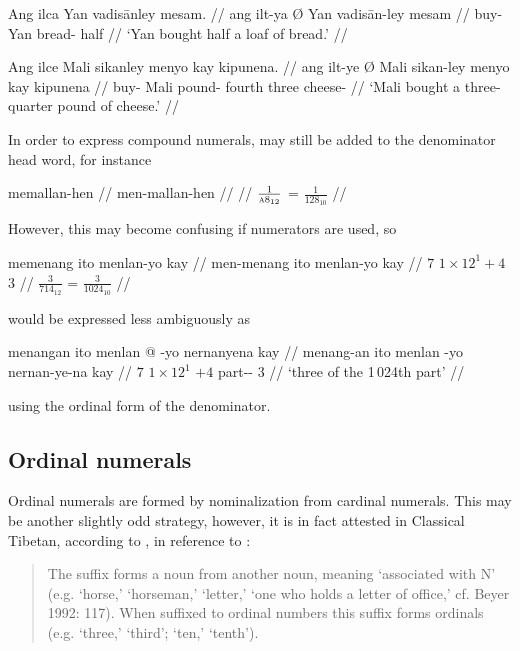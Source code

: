 \pex\label{ex:simplefrac}
\a\begingl
	\gla Ang ilca {} Yan vadisānley mesam. //
	\glb ang ilt-ya Ø Yan vadisān-ley mesam //
	\glc \AgtT{} buy-\TsgM{} \Top{} Yan bread-\PargI{} half //
	\glft `Yan bought half a loaf of bread.' //
\endgl

\a\begingl
	\gla Ang ilce {} Mali sikanley menyo kay kipunena. //
	\glb ang ilt-ye Ø Mali sikan-ley menyo kay kipunena //
	\glc \AgtT{} buy-\TsgM{} \Top{} Mali pound-\PargI{} fourth three
		cheese-\Gen{} //
	\glft `Mali bought a three-quarter pound of cheese.' //
\endgl
\xe

In order to express compound numerals,  may still be added to
the denominator head word, for instance

\ex
\begingl
	\gla memallan-hen //
	\glb men-mallan-hen //
	 //
	\glft $\frac{1}{\textsc{a}8_{12}}$ = $\frac{1}{128_{10}}$ //
\endgl
\xe

\noindent However, this may become confusing if numerators are used, so %

\ex
\ljudge\ques\begingl
	\gla memenang ito menlan-yo kay //
	\glb men-menang ito menlan-yo kay //
	 {$7$} {$1 \times 12^1 + 4$} {$3$} //
	\glft $\frac{3}{714_{12}}$ = $\frac{3}{1024_{10}}$ //
\endgl
\xe

\noindent would be expressed less ambiguously as

\ex
\begingl
	\gla menangan ito menlan @ -yo nernanyena kay //
	\glb menang-an ito menlan -yo nernan-ye-na kay //
	 {$7$} {$1 \times 12^1$} {$+4$} part-\Pl{}-\Gen{} 
		$3$ //
	\glft `three of the 1\,024th part' //
\endgl
\xe

\noindent using the ordinal form of the denominator.



\subsection{Ordinal numerals}

Ordinal numerals are formed by nominalization from cardinal numerals. This may 
be another slightly odd strategy, however, it is in fact attested in Classical 
Tibetan, according to \citet{chungetal2014}, in reference to \citet{beyer1992}:

\blockcquote[626]{chungetal2014}{The suffix  forms a noun from another 
noun, meaning `associated with N' (e.g.  `horse,'  
`horseman,'  `letter,'  `one who holds a letter of 
office,' cf. \nocite{beyer1992} Beyer 1992: 117). When suffixed to ordinal 
numbers this suffix forms ordinals (e.g.  `three,'  
`third';  `ten,'  `tenth').}

